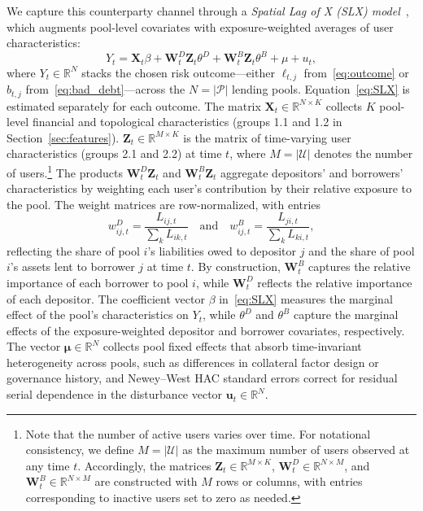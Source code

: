\documentclass[a4paper,UKenglish,cleveref, autoref, thm-restate]{informs3}
\begin{document}
We capture this counterparty channel through a \emph{Spatial Lag of X (SLX) 
model}~\citep{Elhorst2014}, which augments pool-level covariates with 
exposure-weighted averages of user characteristics:
\begin{equation}
Y_t = \mathbf{X}_t \beta + \mathbf{W}^{D}_t \mathbf{Z}_t \theta^{D} + 
\mathbf{W}^{B}_t \mathbf{Z}_t \theta^{B} + \mu + u_t,
\label{eq:SLX}
\end{equation}
where $Y_t \in \mathbb{R}^{N}$ stacks the chosen risk outcome---either 
$\ell_{t,j}$ from~\eqref{eq:outcome} or $b_{t,j}$ 
from~\eqref{eq:bad_debt}---across the $N = |\mathcal{P}|$ lending pools. 
Equation~\eqref{eq:SLX} is estimated separately for each outcome. The matrix 
$\mathbf{X}_t \in \mathbb{R}^{N \times K}$ collects $K$ pool-level financial 
and topological characteristics (groups 1.1 and 1.2 in 
Section~\ref{sec:features}). $\mathbf{Z}_t \in \mathbb{R}^{M \times K}$ is 
the matrix of time-varying user characteristics (groups 2.1 and 
2.2) at time $t$, where $M = 
|\mathcal{U}|$ denotes the number of users.\footnote{Note that the number of active users varies over time. For 
notational consistency, we define $M = |\mathcal{U}|$ as the maximum number 
of users observed at any time $t$. Accordingly, the matrices $\mathbf{Z}_t 
\in \mathbb{R}^{M \times K}$, $\mathbf{W}_t^{D} \in \mathbb{R}^{N \times M}$, 
and $\mathbf{W}_t^{B} \in \mathbb{R}^{N \times M}$ are constructed with $M$ 
rows or columns, with entries corresponding to inactive users set to zero as 
needed.} The products $\mathbf{W}^D_t \mathbf{Z}_t$ and $\mathbf{W}^B_t 
\mathbf{Z}_t$ aggregate depositors' and borrowers' characteristics by 
weighting each user's contribution by their relative exposure to the pool. 
The weight matrices are row-normalized, with entries
\begin{equation}
w^{D}_{ij,t} = \frac{L_{ij,t}}{\sum_{k} L_{ik,t}} \quad \text{and} \quad 
w^{B}_{ij,t} = \frac{L_{ji,t}}{\sum_{k} L_{ki,t}},
\end{equation}
reflecting the share of pool $i$'s liabilities owed to depositor $j$ and the 
share of pool $i$'s assets lent to borrower $j$ at time $t$. By construction, 
$\mathbf{W}^B_t$ captures the relative importance of each borrower to pool 
$i$, while $\mathbf{W}^D_t$ reflects the relative importance of each 
depositor. The coefficient vector $\beta$ in~\eqref{eq:SLX} measures the 
marginal effect of the pool's characteristics on $Y_t$, while $\theta^D$ and 
$\theta^B$ capture the marginal effects of the exposure-weighted depositor and 
borrower covariates, respectively. The vector $\boldsymbol{\mu} \in 
\mathbb{R}^{N}$ collects pool fixed effects that absorb time-invariant 
heterogeneity across pools, such as differences in collateral factor design or 
governance history, and Newey--West HAC standard errors correct for residual 
serial dependence in the disturbance vector $\mathbf{u}_t \in \mathbb{R}^N$.
\end{document}
